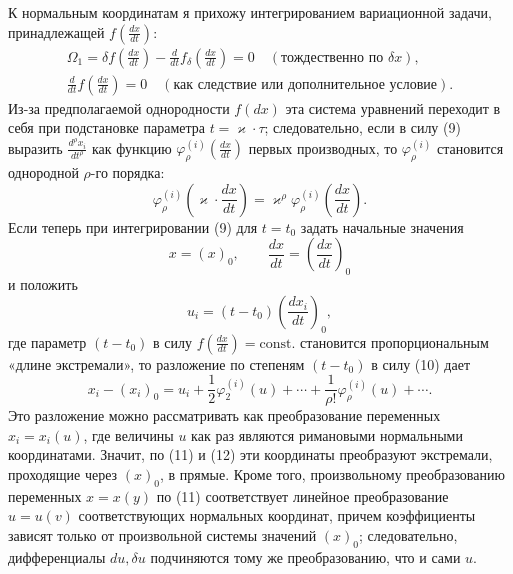 \documentclass[11pt]{article}
\begin{document}
К нормальным координатам я прихожу интегрированием вариационной задачи, принадлежащей \(f\!\left(\frac{dx}{dt}\right)\):
\begin{equation}
\begin{gathered}
\Omega_1=\delta f\!\left(\frac{dx}{dt}\right)
-\frac{d}{dt}f_\delta\!\left(\frac{dx}{dt}\right)=0
\quad(\text{тождественно по }\delta x),\\
\frac{d}{dt}f\!\left(\frac{dx}{dt}\right)=0
\quad(\text{как следствие или дополнительное условие}).
\end{gathered}
\tag{9}
\end{equation}
Из-за предполагаемой однородности \(f(dx)\) эта система уравнений переходит в себя при подстановке параметра \(t=\varkappa\cdot\tau\); следовательно, если в силу (9) выразить \(\frac{d^\rho x_i}{dt^\rho}\) как функцию \(\varphi_\rho^{(i)}\!\left(\frac{dx}{dt}\right)\) первых производных, то \(\varphi_\rho^{(i)}\) становится однородной \(\rho\)-го порядка:
\begin{equation}
\varphi_\rho^{(i)}\!\left(\varkappa\cdot\frac{dx}{dt}\right)
=\varkappa^\rho\varphi_\rho^{(i)}\!\left(\frac{dx}{dt}\right).
\tag{10}
\end{equation}
Если теперь при интегрировании (9) для \(t=t_0\) задать начальные значения
\[
x=(x)_0,\qquad \frac{dx}{dt}=\left(\frac{dx}{dt}\right)_0
\]
и положить
\begin{equation}
u_i=(t-t_0)\left(\frac{dx_i}{dt}\right)_0,
\tag{11}
\end{equation}
где параметр \((t-t_0)\) в силу \(f\!\left(\frac{dx}{dt}\right)=\mathrm{const.}\) становится пропорциональным «длине экстремали», то разложение по степеням \((t-t_0)\) в силу (10) дает
\begin{equation}
x_i-(x_i)_0=u_i+\frac12\varphi_2^{(i)}(u)+\cdots+
\frac{1}{\rho!}\varphi_\rho^{(i)}(u)+\cdots .
\tag{12}
\end{equation}
Это разложение можно рассматривать как преобразование переменных \(x_i=x_i(u)\), где величины \(u\) как раз являются римановыми нормальными координатами. Значит, по (11) и (12) эти координаты преобразуют экстремали, проходящие через \((x)_0\), в прямые. Кроме того, произвольному преобразованию переменных \(x=x(y)\) по (11) соответствует линейное преобразование \(u=u(v)\) соответствующих нормальных координат, причем коэффициенты зависят только от произвольной системы значений \((x)_0\); следовательно, дифференциалы \(du,\delta u\) подчиняются тому же преобразованию, что и сами \(u\).
\end{document}
